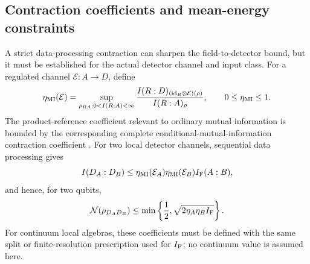 \documentclass[pdflatex,sn-mathphys-num]{sn-jnl}
\begin{document}
\subsection{Contraction coefficients and mean-energy constraints}
A strict data-processing contraction can sharpen the field-to-detector bound, but it must be established for the actual detector channel and input class. For a regulated channel $\mathcal E:A\to D$, define
\begin{equation}
\eta_{\rm MI}(\mathcal E)=
\sup_{\rho_{RA}:0<I(R:A)<\infty}
\frac{I(R:D)_{(\mathrm{id}_R\otimes\mathcal E)(\rho)}}{I(R:A)_\rho},
\qquad 0\leq\eta_{\rm MI}\leq1.
\label{eq:mi-contraction-coefficient}
\end{equation}
The product-reference coefficient relevant to ordinary mutual information is bounded by the corresponding complete conditional-mutual-information contraction coefficient \cite{HircheGeorgeNuradhaWilde2026Conditional}. For two local detector channels, sequential data processing gives
\begin{equation}
I(D_A:D_B)\leq
\eta_{\rm MI}(\mathcal E_A)\eta_{\rm MI}(\mathcal E_B)I_{\rm F}(A:B),
\label{eq:supp-product-mi-contraction}
\end{equation}
and hence, for two qubits,
\begin{equation}
\mathcal N(\rho_{D_AD_B})\leq
\min\left\{\frac12,\sqrt{2\eta_A\eta_B I_{\rm F}}\right\}.
\label{eq:channel-sensitive-negativity-bound}
\end{equation}
For continuum local algebras, these coefficients must be defined with the same split or finite-resolution prescription used for $I_{\rm F}$; no continuum value is assumed here.
\end{document}
